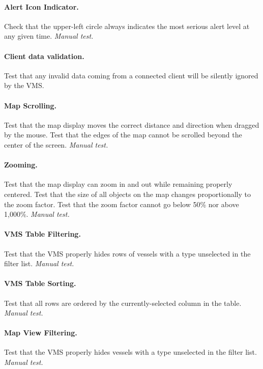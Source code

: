\documentclass{article}
\begin{document}
\paragraph{Alert Icon Indicator.} Check that the upper-left circle always indicates the most serious alert level at any given time. \emph{Manual test.}

\paragraph{Client data validation.} Test that any invalid data coming from a connected client will be silently ignored by the VMS.

\paragraph{Map Scrolling.} Test that the map display moves the correct distance and direction when dragged by the mouse. Test that the edges of the map cannot be scrolled beyond the center of the screen. \emph{Manual test.}

\paragraph{Zooming.} Test that the map display can zoom in and out while remaining properly centered. Test that the size of all objects on the map changes proportionally to the zoom factor. Test that the zoom factor cannot go below 50\% nor above 1,000\%. \emph{Manual test.}

\paragraph{VMS Table Filtering.} Test that the VMS properly hides rows of vessels with a type unselected in the filter list. \emph{Manual test.}

\paragraph{VMS Table Sorting.} Test that all rows are ordered by the currently-selected column in the table. \emph{Manual test.}

\paragraph{Map View Filtering.} Test that the VMS properly hides vessels with a type unselected in the filter list. \emph{Manual test.}
\end{document}
